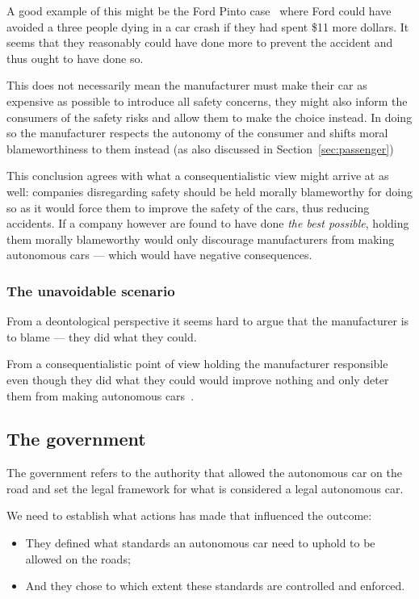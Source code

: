 A good example of this might be the Ford Pinto
case~\cite[Ch.3]{vandepoel_2011_ethics_etaeai} where Ford could have avoided a
three people dying in a car crash if they had spent \$11 more dollars. It seems
that they reasonably could have done more to prevent the accident and thus ought
to have done so.

This does not necessarily mean the manufacturer must make their car as expensive
as possible to introduce all safety concerns, they might also inform the
consumers of the safety risks and allow them to make the choice instead. In
doing so the manufacturer respects the autonomy of the consumer and shifts moral
blameworthiness to them instead (as also discussed in Section~\ref{sec:passenger})

This conclusion agrees with what a consequentialistic view might arrive at as
well: companies disregarding safety should be held morally blameworthy for doing
so as it would force them to improve the safety of the cars, thus reducing
accidents. If a company however are found to have done \textit{the best
  possible}, holding them morally blameworthy would only discourage
manufacturers from making autonomous cars --- which would have negative
consequences.

\subsubsection{The unavoidable scenario}
From a deontological perspective it seems hard to argue that the manufacturer is
to blame --- they did what they could.

From a consequentialistic point of view holding the manufacturer responsible
even though they did what they could would improve nothing and only deter them
from making autonomous cars~\cite{marchant_2012_coming_ccbavatlst}.

\subsection{The government}
The government refers to the authority that allowed the autonomous car on the
road and set the legal framework for what is considered a legal autonomous car.

We need to establish what actions has made that influenced the outcome:
\begin{itemize}
\item They defined what standards an autonomous car need to uphold to be
  allowed on the roads;
\item And they chose to which extent these standards are controlled and enforced.
\end{itemize}

